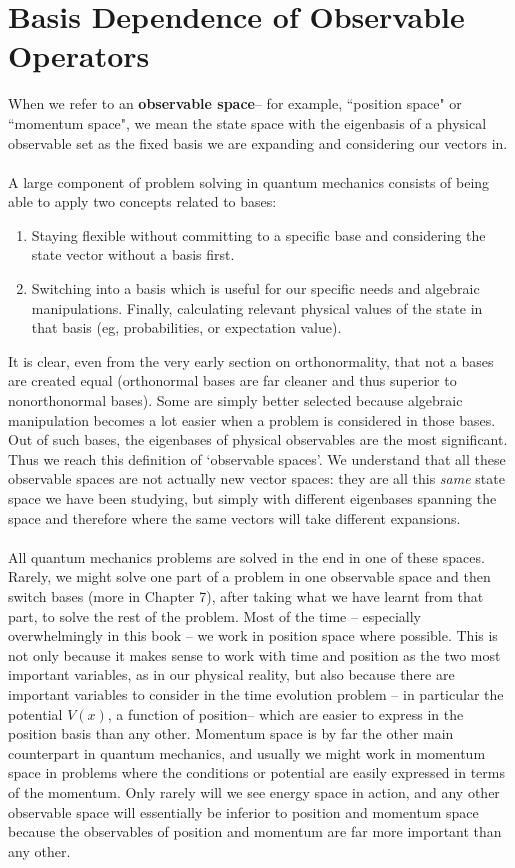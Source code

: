 \section{Basis Dependence of  Observable Operators}
When we refer to an \textbf{observable space}-- for example, ``position space" or ``momentum space", we mean the state space with the eigenbasis of a physical observable set as the fixed basis we are expanding and considering our vectors in.
\\\\
A large component of problem solving in quantum mechanics consists of being able to apply two concepts related to bases:
\begin{enumerate}
    \item Staying flexible without committing to a specific base and considering the state vector without a basis first.
    \item Switching into a basis which is useful for our specific needs and algebraic manipulations. Finally, calculating relevant physical values of the state in that basis (eg, probabilities, or expectation value).
\end{enumerate}
It is clear, even from the very early section on orthonormality, that not a bases are created equal (orthonormal bases are far cleaner and thus superior to nonorthonormal bases). Some are simply better selected because algebraic manipulation becomes a lot easier when a problem is considered in those bases. Out of such bases, the eigenbases of physical observables are the most significant. Thus we reach this definition of `observable spaces'. We understand that all these observable spaces are not actually new vector spaces: they are all this \textit{same} state space we have been studying, but simply with different eigenbases spanning the space and therefore where the same vectors will take different expansions. 
\\\\
All quantum mechanics problems are solved in the end in one of these spaces. Rarely, we might solve one part of a problem in one observable space and then switch bases (more in Chapter 7), after taking what we have learnt from that part, to solve the rest of the problem. Most of the time -- especially overwhelmingly in this book -- we work in position space where possible. This is not only because it makes sense to work with time and position as the two most important variables, as in our physical reality, but also because there are important variables to consider in the time evolution problem -- in particular the potential $V(x)$, a function of position-- which are easier to express in the position basis than any other. Momentum space is by far the other main counterpart in quantum mechanics, and usually we might work in momentum space in problems where the conditions or potential are easily expressed in terms of the momentum. Only rarely will we see energy space in action, and any other observable space will essentially be inferior to position and momentum space because the observables of position and momentum are far more important than any other.
